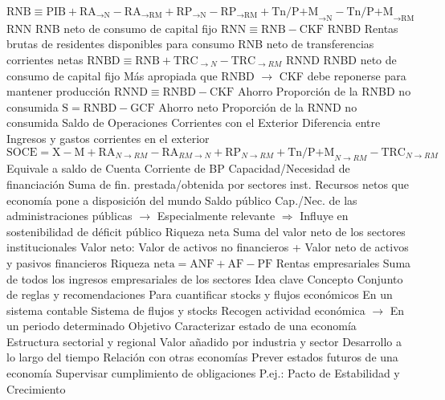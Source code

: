 \documentclass{nuevotema}
\begin{document}
\begin{esquemal}
				\4[] $\text{RNB} \equiv \text{PIB} + \text{RA}_{\to \text{N}} - \text{RA}_{\to \text{RM}} + \text{RP}_{\to \text{N}} - \text{RP}_{\to \text{RM}} + \text{Tn/P+M}_{\to \text{N}} - \text{Tn/P+M}_{\to \text{RM}}$
			\3 RNN
				\4 RNB neto de consumo de capital fijo
				\4[] $\text{RNN} \equiv \text{RNB} - \text{CKF}$
			\3 RNBD
				\4 Rentas brutas de residentes disponibles para consumo
				\4[] RNB neto de transferencias corrientes netas
				\4[] $\text{RNBD} \equiv \text{RNB} + \text{TRC}_{\to N} - \text{TRC}_{\to RM}$
			\3 RNND
				\4 RNBD neto de consumo de capital fijo
				\4[] Más apropiada que RNBD
				\4[] $\to$ CKF debe reponerse para mantener producción
				\4[] $\text{RNND} \equiv \text{RNBD} - \text{CKF}$
			\3 Ahorro
				\4 Proporción de la RNBD no consumida
				\4[] $\text{S} = \text{RNBD} - \text{GCF}$
			\3 Ahorro neto
				\4 Proporción de la RNND no consumida
			\3 Saldo de Operaciones Corrientes con el Exterior
				\4 Diferencia entre
				\4[] Ingresos y gastos corrientes en el exterior
				\4[] $\text{SOCE} = \text{X} - \text{M} + \text{RA}_{N \to RM} - \text{RA}_{RM \to N}+ \text{RP}_{N \to RM} + \text{Tn/P+M}_{N \to RM} - \text{TRC}_{N \to RM}$
				\4 Equivale a saldo de Cuenta Corriente de BP
			\3 Capacidad/Necesidad de financiación
				\4 Suma de fin. prestada/obtenida por sectores inst.
				\4[] Recursos netos que economía pone a disposición del mundo
				\4 Saldo público
				\4[] Cap./Nec. de las administraciones públicas
				\4[] $\to$ Especialmente relevante
				\4[] $\Rightarrow$ Influye en sostenibilidad de déficit público
			\3 Riqueza neta
				\4 Suma del valor neto de los sectores institucionales
				\4 Valor neto:
				\4[]  Valor de activos no financieros
				\4[] + Valor neto de activos y pasivos financieros
				\4[] $\text{Riqueza neta} = \text{ANF} + \text{AF} - \text{PF}$
			\3 Rentas empresariales
				\4 Suma de todos los ingresos empresariales de los sectores
	\1 
		\2 Idea clave
			\3 Concepto
				\4 Conjunto de reglas y recomendaciones
				\4[] Para cuantificar stocks y flujos económicos
				\4[] En un sistema contable
				\4 Sistema de flujos y stocks
				\4[] Recogen actividad económica
				\4[] $\to$ En un periodo determinado
			\3 Objetivo
				\4 Caracterizar estado de una economía
				\4[] Estructura sectorial y regional
				\4[] Valor añadido por industria y sector
				\4[] Desarrollo a lo largo del tiempo
				\4[] Relación con otras economías
				\4[] Prever estados futuros de una economía
				\4 Supervisar cumplimiento de obligaciones
				\4[] P.ej.: Pacto de Estabilidad y Crecimiento

\end{esquemal}
\end{document}
